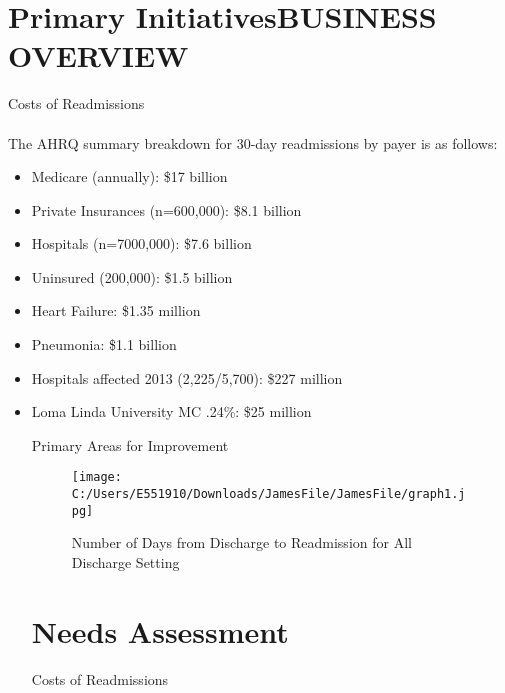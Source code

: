 \documentclass[11pt]{article}\usepackage[]{graphicx}\usepackage[]{color}
\begin{document}
\section{Primary InitiativesBUSINESS OVERVIEW}
Costs of Readmissions
\paragraph{}
The AHRQ summary breakdown for 30-day readmissions by payer is as follows:

\begin{itemize}

\item	Medicare (annually):				\$17 billion
\item	Private Insurances (n=600,000): 		\$8.1 billion
\item	Hospitals (n=7000,000): 			\$7.6 billion
\item	Uninsured (200,000): 	                  		\$1.5 billion
\item		Heart Failure:	                   			\$1.35 million
\item		Pneumonia:    					\$1.1 billion
\item	Hospitals affected 2013 (2,225/5,700):	\$227 million
\item		Loma Linda University MC .24\%: 		\$25 million
\begin{itemize}
Primary Areas for Improvement


\begin{figure}[ht!]
    \centering
    \texttt{[image: C:/Users/E551910/Downloads/JamesFile/JamesFile/graph1.jpg]}
    \caption{Number of Days from Discharge to Readmission for All Discharge Setting}
    \label{fig:FirstGraph}
\end{figure}

\newpage

\section{Needs Assessment}
Costs of Readmissions
\paragraph{}


\end{itemize}
\end{itemize}
\end{document}

